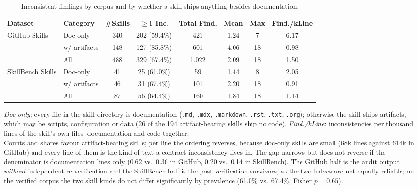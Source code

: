 \begin{table}[t]
  \centering
  \small
  \setlength{\tabcolsep}{3.0pt}
  \caption{Inconsistent findings by corpus and by whether a skill ships anything
    besides documentation.}
  \label{tab:finding_stats}
  \begin{tabular}{llcccccc}
    \toprule
    Dataset & Category & \#Skills & $\ge$1 Inc. & Total Find. & Mean & Max
      & Find./kLine \\
    \midrule
    GitHub Skills
      & Doc-only      & 340 & 202 (59.4\%) &   421 & 1.24 &  7 & 6.17 \\
      & w/ artifacts  & 148 & 127 (85.8\%) &   601 & 4.06 & 18 & 0.98 \\
      & All           & 488 & 329 (67.4\%) & 1{,}022 & 2.09 & 18 & 1.50 \\
    \midrule
    SkillBench Skills
      & Doc-only      &  41 &  25 (61.0\%) &    59 & 1.44 &  8 & 2.05 \\
      & w/ artifacts  &  46 &  31 (67.4\%) &   101 & 2.20 & 18 & 0.91 \\
      & All           &  87 &  56 (64.4\%) &   160 & 1.84 & 18 & 1.14 \\
    \bottomrule
  \end{tabular}

  \vspace{2pt}
  \begin{minipage}{\linewidth}
    \footnotesize\raggedright
    \emph{Doc-only}: every file in the skill directory is documentation
    (\texttt{.md}, \texttt{.mdx}, \texttt{.markdown}, \texttt{.rst},
    \texttt{.txt}, \texttt{.org}); otherwise the skill ships artifacts, which may
    be scripts, configuration or data (26 of the 194 artifact-bearing skills
    ship no code). \emph{Find./kLine}: inconsistencies per thousand lines of the
    skill's own files, documentation and code together.\\[1pt]
    Counts and shares favour artifact-bearing skills; per line the ordering
    reverses, because doc-only skills are small (68k lines against 614k in
    GitHub) and every line of them is the kind of text a contract inconsistency
    lives in. The gap narrows but does not reverse if the denominator is
    documentation lines only (0.62 vs.\ 0.36 in GitHub, 0.20 vs.\ 0.14 in
    SkillBench). The GitHub half is the audit output \emph{without} independent
    re-verification and the SkillBench half is the post-verification survivors,
    so the two halves are not equally reliable; on the verified corpus the two
    skill kinds do not differ significantly by prevalence (61.0\% vs.\ 67.4\%,
    Fisher $p=0.65$).
  \end{minipage}
\end{table}
